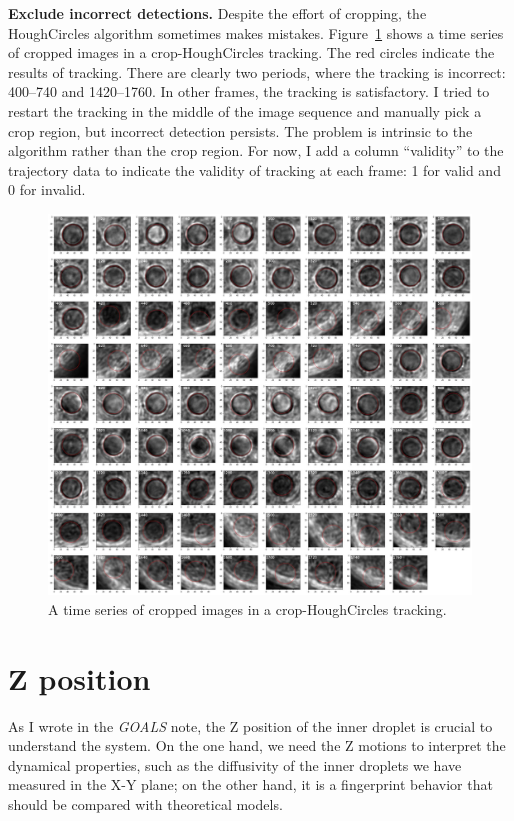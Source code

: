 \documentclass[onecolumn,aps, pre,amsmath,amssymb,longbibliography,11pt]{revtex4-2}
\begin{document}
\textbf{Exclude incorrect detections.}
Despite the effort of cropping, the HoughCircles algorithm sometimes makes mistakes.
Figure~\ref{fig:crop-HoughCircles-montage} shows a time series of cropped images in a crop-HoughCircles tracking.
The red circles indicate the results of tracking.
There are clearly two periods, where the tracking is incorrect: 400--740 and 1420--1760.
In other frames, the tracking is satisfactory.
I tried to restart the tracking in the middle of the image sequence and manually pick a crop region, but incorrect detection persists.
The problem is intrinsic to the algorithm rather than the crop region.
For now, I add a column ``validity'' to the trajectory data to indicate the validity of tracking at each frame: 1 for valid and 0 for invalid.

\begin{figure}
  \includegraphics[width=6in]{crop-HoughCircles-montage.jpg}
  \caption{A time series of cropped images in a crop-HoughCircles tracking.}
  \label{fig:crop-HoughCircles-montage}
\end{figure}

\section{Z position}
As I wrote in the \textit{GOALS} note, the Z position of the inner droplet is crucial to understand the system.
On the one hand, we need the Z motions to interpret the dynamical properties, such as the diffusivity of the inner droplets we have measured in the X-Y plane;
on the other hand, it is a fingerprint behavior that should be compared with theoretical models.
\end{document}

